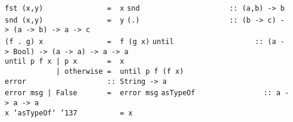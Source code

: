 \mbox{\tt fst\ (x,y)\ \ \ \ \ \ \ \ \ \ \ \ \ \ \ =\ \ x}
%
\eprogB\noindent\bprogB
\mbox{\tt snd\ \ \ \ \ \ \ \ \ \ \ \ \ \ \ \ \ \ \ \ \ ::\ (a,b)\ ->\ b}\\
\mbox{\tt snd\ (x,y)\ \ \ \ \ \ \ \ \ \ \ \ \ \ \ =\ \ y}
%
\eprogB\noindent\bprogB
\mbox{\tt (.)\ \ \ \ \ \ \ \ \ \ \ \ \ \ \ \ \ \ \ \ \ ::\ (b\ ->\ c)\ ->\ (a\ ->\ b)\ ->\ a\ ->\ c}\\
\mbox{\tt (f\ .\ g)\ x\ \ \ \ \ \ \ \ \ \ \ \ \ \ \ =\ \ f\ (g\ x)}
%
\eprogB\noindent\bprogB
\mbox{\tt until\ \ \ \ \ \ \ \ \ \ \ \ \ \ \ \ \ \ \ ::\ (a\ ->\ Bool)\ ->\ (a\ ->\ a)\ ->\ a\ ->\ a}\\
\mbox{\tt until\ p\ f\ x\ |\ p\ x\ \ \ \ \ \ \ =\ \ x}\\
\mbox{\tt \ \ \ \ \ \ \ \ \ \ \ \ |\ otherwise\ =\ \ until\ p\ f\ (f\ x)}
%
\eprogB\noindent\bprogB
\mbox{\tt error\ \ \ \ \ \ \ \ \ \ \ \ \ \ \ \ \ \ \ ::\ String\ ->\ a}\\
\mbox{\tt error\ msg\ |\ False\ \ \ \ \ \ \ =\ \ error\ msg}
%
\eprogB\noindent\bprogB
\mbox{\tt asTypeOf\ \ \ \ \ \ \ \ \ \ \ \ \ \ \ \ ::\ a\ ->\ a\ ->\ a}\\
\mbox{\tt x\ `asTypeOf`\ {\char'137}\ \ \ \ \ \ \ \ \ \ =\ x}
%
\eprogB
